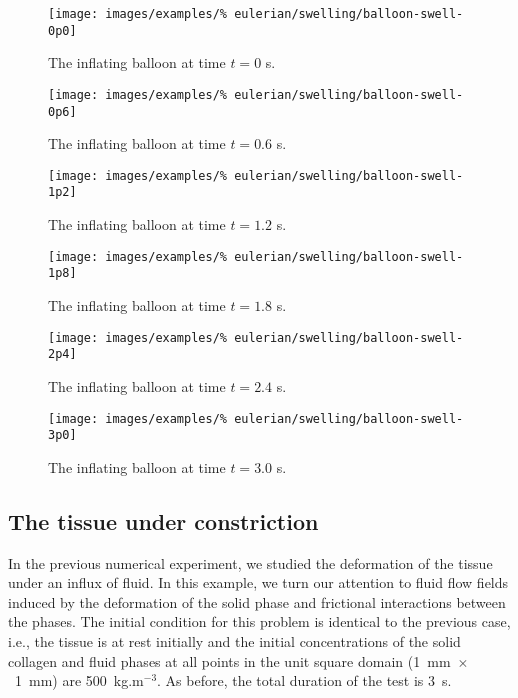 \begin{figure}[!hptb]
  \centering
  \texttt{[image: images/examples/\%
    eulerian/swelling/balloon-swell-0p0]}
  \caption{The inflating balloon at time $t=0$ s.} 
  \label{swelling-balloon-image-0p0}
\end{figure}

\begin{figure}[!hptb]
  \centering
  \texttt{[image: images/examples/\%
    eulerian/swelling/balloon-swell-0p6]}
  \caption{The inflating balloon at time $t=0.6$ s.} 
  \label{swelling-balloon-image-0p6}
\end{figure}

\begin{figure}[!hptb]
  \centering
  \texttt{[image: images/examples/\%
    eulerian/swelling/balloon-swell-1p2]}
  \caption{The inflating balloon at time $t=1.2$ s.} 
  \label{swelling-balloon-image-1p2}
\end{figure}

\begin{figure}[!hptb]
  \centering
  \texttt{[image: images/examples/\%
    eulerian/swelling/balloon-swell-1p8]}
  \caption{The inflating balloon at time $t=1.8$ s.} 
  \label{swelling-balloon-image-1p8}
\end{figure}

\begin{figure}[!hptb]
  \centering
  \texttt{[image: images/examples/\%
    eulerian/swelling/balloon-swell-2p4]}
  \caption{The inflating balloon at time $t=2.4$ s.} 
  \label{swelling-balloon-image-2p4}
\end{figure}

\begin{figure}[!hptb]
  \centering
  \texttt{[image: images/examples/\%
    eulerian/swelling/balloon-swell-3p0]}
  \caption{The inflating balloon at time $t=3.0$ s.} 
  \label{swelling-balloon-image-3p0}
\end{figure}

\clearpage

\subsection{The tissue under constriction}
\label{constriction-2}

In the previous numerical experiment, we studied the deformation of
the tissue under an influx of fluid. In this example, we turn our
attention to fluid flow fields induced by the deformation of the solid
phase and frictional interactions between the phases. The initial
condition for this problem is identical to the previous case, i.e.,
the tissue is at rest initially and the initial concentrations of the
solid collagen and fluid phases at all points in the unit square
domain \mbox{(1~mm $\times$ 1~mm)} are 500~kg.m$^{-3}$. As before, the
total duration of the test is 3~s.

